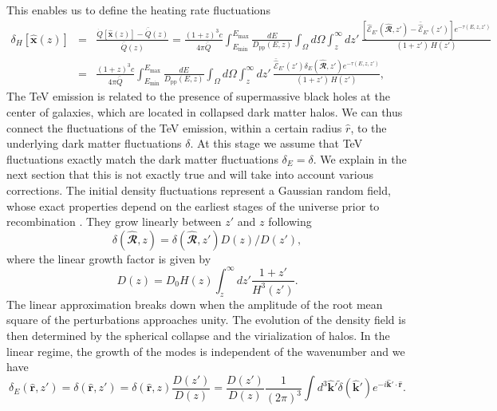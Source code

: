 \documentclass[numberedappendix]{emulateapj}
\newcommand{\calR}{\ensuremath{\bm\hat{\mathbfcal{R}}}}
\begin{document}
This enables us to define the heating rate fluctuations
\begin{eqnarray}
\label{eq:fluc_exp0}
\delta_H[\mathbf{\hat{x}}(z)]&=&\frac{\dot{Q}[\mathbf{\hat{x}}(z)]-\bar{\dot{Q}}(z)}{\bar{\dot{Q}}(z)}=\frac{(1+z)^3c}{4\pi\bar{\dot{Q}}} \int_{E_{\mathrm{min}}}^{E_{\mathrm{max}}}\frac{dE}{D_{\mathrm{pp}}(E,z)}\int_{\Omega}d\Omega\int_z^{\infty} d z'\,\frac{ \left[ \mathcal{\hat E}_{E'}(\calR, z')-\bar{\hat{\mathcal{E}}}_{E'}(z')\right] e^{-\tau(E,z,z')}}{(1+z')\,H(z')} \nonumber\\ 
&=&\frac{(1+z)^3 c}{4\pi\bar{\dot{Q}}} \int_{E_{\mathrm{min}}}^{E_{\mathrm{max}}} \frac{dE}{D_{\mathrm{pp}}(E,z)}\int_{\Omega}d\Omega\int_z^{\infty} d z'\, \frac{\bar{\hat{\mathcal{E}}}_{E'}(z')\delta_E(\calR, z') e^{-\tau(E,z,z')}}{(1+z')\,H(z')},
\end{eqnarray}
The TeV emission is related to the presence of supermassive black holes at the center of galaxies, which are located in collapsed dark matter halos. We can thus connect the fluctuations of the TeV emission, within a certain radius $\hat r$, to the underlying dark matter fluctuations $\delta$.
At this stage we assume that TeV fluctuations exactly match the dark matter fluctuations $\delta_E=\delta$. We explain in the next section that this is not exactly true and will take into account various corrections. The initial density fluctuations represent a Gaussian random field, whose exact properties depend on the earliest stages of the universe prior to recombination \citep{1986ApJ...304...15B,Peebles}. They grow linearly between $z'$ and $z$ following  \citep{ 1977MNRAS.179..351H}
\begin{equation}
  \label{eq:growth}
\delta(\calR, z)=\delta(\calR, z')D(z)/D(z'),
\end{equation}
where the linear growth factor is given by
\begin{equation}
\label{eq:growth_1}
D(z)=D_0H(z)\int_z^{\infty}dz'\frac{1+z'}{H^3(z')}.
\end{equation}
The linear approximation breaks down when the amplitude of the root mean square of the perturbations approaches unity. The evolution of the density field is then determined by the spherical collapse \citep{1972ApJ...176....1G} and the virialization of halos. In the linear regime, the growth of the modes is independent of the wavenumber and we have
\begin{equation}
\label{eq:FT_delta}
\delta_E(\mathbf{\hat{r}}, z')=\delta(\mathbf{\hat{r}}, z')
=\delta(\mathbf{\hat{r}}, z)\frac{D(z')}{D(z)}
=\frac{D(z')}{D(z)}\frac{1}{(2\pi)^3}\int d^3\mathbf{\hat k'} \tilde{\delta}(\mathbf{\hat k'}) e^{-i\mathbf{\hat k'}\cdot\mathbf{\hat r}}.
\end{equation}
\end{document}
